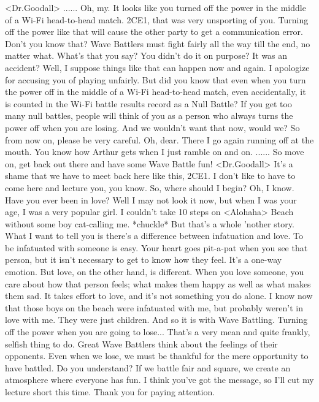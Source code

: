 <Dr.Goodall> ...... 
Oh, my. It looks like you turned off the power in the middle of a 
Wi-Fi head-to-head match.  {2C}{E1}, that was very unsporting of you. 
Turning off the power like that will cause the other party to get 
a communication error. Don't you know that? 
Wave Battlers must fight fairly all the way till the end, no matter what. 
What's that you say? 
You didn't do it on purpose? It was an accident? 
Well, I suppose things like that can happen now and again. 
I apologize for accusing you of playing unfairly. 
But did you know that even when you turn the power off in the middle 
of a Wi-Fi head-to-head match, even accidentally, 
it is counted in the Wi-Fi battle results record as a Null Battle? 
If you get too many null battles, people will think of you as a person 
who always turns the power off when you are losing. 
And we wouldn't want that now, would we? 
So from now on, please be very careful. 
Oh, dear. There I go again running off at the mouth. 
You know how Arthur gets when I just ramble on and on. 
...... 
So move on, get back out there and have some Wave Battle fun! 
<Dr.Goodall> It's a shame that we have to meet back here like this, {2C}{E1}. 
I don't like to have to come here and lecture you, you know. 
So, where should I begin? Oh, I know. Have you ever been in love? 
Well I may not look it now, but when I was your age, I was a very popular girl. 
I couldn't take 10 steps on <Alohaha> Beach without some boy cat-calling me. 
*chuckle* But that's a whole 'nother story. What I want to tell you is 
there's a difference between infatuation and love. 
To be infatuated with someone is easy. 
Your heart goes pit-a-pat when you see that person, but it isn't 
necessary to get to know how they feel. 
It's a one-way emotion. 
But love, on the other hand, is different. 
When you love someone, you care about how that person feels; what makes them 
happy as well as what makes them sad. 
It takes effort to love, and it's not something you do alone. 
I know now that those boys on the beach were infatuated with me, 
but probably weren't in love with me. 
They were just children. And so it is with Wave Battling. 
Turning off the power when you are going to lose... That's a very 
mean and quite frankly, selfish thing to do. 
Great Wave Battlers think about the feelings of their opponents. 
Even when we lose, we must be thankful for the mere opportunity to have battled. 
Do you understand? 
If we battle fair and square, we create an atmosphere where everyone has fun. 
I think you've got the message, so I'll cut my lecture short this time. 
Thank you for paying attention. 
